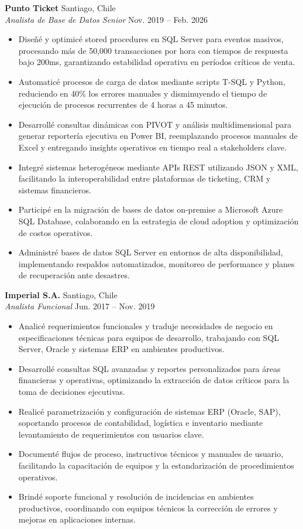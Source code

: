 \documentclass[11pt,letterpaper]{article}
\begin{document}
\textbf{Punto Ticket} \hfill Santiago, Chile\\
\textit{Analista de Base de Datos Senior} \hfill Nov. 2019 – Feb. 2026
\begin{itemize}
  \item Diseñé y optimicé stored procedures en SQL Server para eventos masivos, procesando más de 50,000 transacciones por hora con tiempos de respuesta bajo 200ms, garantizando estabilidad operativa en períodos críticos de venta.
  \item Automaticé procesos de carga de datos mediante scripts T-SQL y Python, reduciendo en 40\% los errores manuales y disminuyendo el tiempo de ejecución de procesos recurrentes de 4 horas a 45 minutos.
  \item Desarrollé consultas dinámicas con PIVOT y análisis multidimensional para generar reportería ejecutiva en Power BI, reemplazando procesos manuales de Excel y entregando insights operativos en tiempo real a stakeholders clave.
  \item Integré sistemas heterogéneos mediante APIs REST utilizando JSON y XML, facilitando la interoperabilidad entre plataformas de ticketing, CRM y sistemas financieros.
  \item Participé en la migración de bases de datos on-premise a Microsoft Azure SQL Database, colaborando en la estrategia de cloud adoption y optimización de costos operativos.
  \item Administré bases de datos SQL Server en entornos de alta disponibilidad, implementando respaldos automatizados, monitoreo de performance y planes de recuperación ante desastres.
\end{itemize}
\vspace{2pt}
\textbf{Imperial S.A.} \hfill Santiago, Chile\\
\textit{Analista Funcional} \hfill Jun. 2017 – Nov. 2019
\begin{itemize}
  \item Analicé requerimientos funcionales y traduje necesidades de negocio en especificaciones técnicas para equipos de desarrollo, trabajando con SQL Server, Oracle y sistemas ERP en ambientes productivos.
  \item Desarrollé consultas SQL avanzadas y reportes personalizados para áreas financieras y operativas, optimizando la extracción de datos críticos para la toma de decisiones ejecutivas.
  \item Realicé parametrización y configuración de sistemas ERP (Oracle, SAP), soportando procesos de contabilidad, logística e inventario mediante levantamiento de requerimientos con usuarios clave.
  \item Documenté flujos de proceso, instructivos técnicos y manuales de usuario, facilitando la capacitación de equipos y la estandarización de procedimientos operativos.
  \item Brindé soporte funcional y resolución de incidencias en ambientes productivos, coordinando con equipos técnicos la corrección de errores y mejoras en aplicaciones internas.
\end{itemize}
\end{document}
